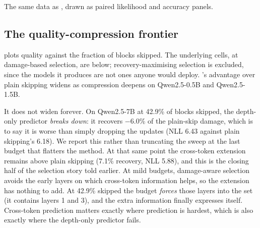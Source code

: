 The same data as , drawn as paired likelihood and accuracy panels.

\subsection{The quality-compression frontier}
\label{sec:app-pareto}

 plots quality against the fraction of blocks skipped. The underlying
cells, at damage-based selection, are below; recovery-maximising selection is excluded, since
the models it produces are not ones anyone would deploy. \mname's advantage over plain
skipping widens as compression deepens on Qwen2.5-0.5B and Qwen2.5-1.5B.

It does not widen forever. On Qwen2.5-7B at 42.9\% of blocks skipped, the depth-only
predictor \emph{breaks down}: it recovers $-6.0$\% of the plain-skip damage, which is to
say it is worse than simply dropping the updates (NLL 6.43 against plain skipping's
6.18). We report this rather than truncating the sweep at the last budget that flatters
the method. At that same point the cross-token extension remains above plain skipping
(7.1\% recovery, NLL 5.88), and this is the closing half of the selection story
told earlier. At mild budgets, damage-aware selection avoids the early layers on which
cross-token information helps, so the extension has nothing to add. At 42.9\% skipped
the budget \emph{forces} those layers into the set (it contains layers 1 and 3), and the extra
information finally expresses itself. Cross-token prediction matters exactly where prediction
is hardest, which is also exactly where the depth-only predictor fails.

